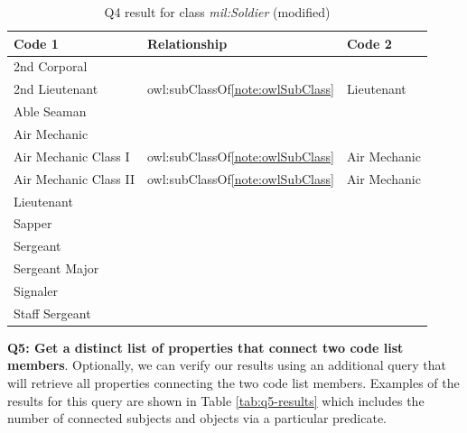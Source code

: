 \begin{table}[ht]
\footnotesize
\centering
\begin{tabular}{|l|l|l|}
\hline
\textbf{Code 1}             & \textbf{Relationship} & \textbf{Code 2}             \\ \hline
2nd Corporal                &                   &                             \\ \hline
2nd Lieutenant              & owl:subClassOf\cref{note:owlSubClass}    & Lieutenant                  \\ \hline
Able Seaman                 &                   &                             \\ \hline
Air Mechanic                &                   &                             \\ \hline
Air Mechanic Class I        & owl:subClassOf\cref{note:owlSubClass}    & Air Mechanic                \\ \hline
Air Mechanic Class II       & owl:subClassOf\cref{note:owlSubClass}    & Air Mechanic                \\ \hline
Lieutenant                  &                   &                             \\ \hline
Sapper                      &                   &                             \\ \hline
Sergeant                    &                   &                             \\ \hline
Sergeant Major              &                   &                             \\ \hline
Signaler                    &                   &                             \\ \hline
Staff Sergeant              &                   &                             \\ \hline
\end{tabular}
\caption{Q4 result for class \textit{mil:Soldier} (modified)} \label{tab:q4-results}
\end{table}

\medskip
\noindent\textbf{Q5: Get a distinct list of properties that connect two code list members}. Optionally, we can verify our results using an additional query that will retrieve all properties connecting the two code list members. Examples of the results for this query are shown in Table \ref{tab:q5-results} which includes the number of connected subjects and objects via a particular predicate.

